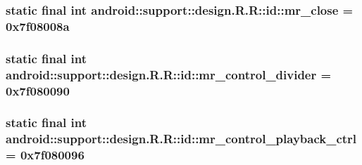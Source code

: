 \hypertarget{classandroid_1_1support_1_1design_1_1_r_1_1id_d0e95c439cb3ec206415427d57ff9317}{
\subsubsection[{mr\_\-close}]{\setlength{\rightskip}{0pt plus 5cm}static final int android::support::design.R.R::id::mr\_\-close = 0x7f08008a}}
\label{classandroid_1_1support_1_1design_1_1_r_1_1id_d0e95c439cb3ec206415427d57ff9317}


\hypertarget{classandroid_1_1support_1_1design_1_1_r_1_1id_0fb9fe754db94198c4072c1291cf3de4}{
\subsubsection[{mr\_\-control\_\-divider}]{\setlength{\rightskip}{0pt plus 5cm}static final int android::support::design.R.R::id::mr\_\-control\_\-divider = 0x7f080090}}
\label{classandroid_1_1support_1_1design_1_1_r_1_1id_0fb9fe754db94198c4072c1291cf3de4}


\hypertarget{classandroid_1_1support_1_1design_1_1_r_1_1id_1e701bdb00b92ca17a5b0f231baa2958}{
\subsubsection[{mr\_\-control\_\-playback\_\-ctrl}]{\setlength{\rightskip}{0pt plus 5cm}static final int android::support::design.R.R::id::mr\_\-control\_\-playback\_\-ctrl = 0x7f080096}}
\label{classandroid_1_1support_1_1design_1_1_r_1_1id_1e701bdb00b92ca17a5b0f231baa2958}


